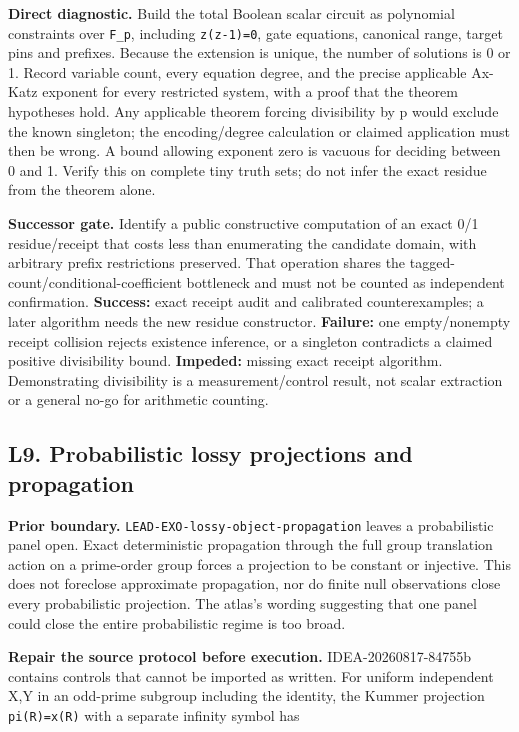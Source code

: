 \documentclass[
  10pt,
]{article}
\begin{document}
\textbf{Direct diagnostic.} Build the total Boolean scalar circuit as
polynomial constraints over \texttt{F\_p}, including \texttt{z(z-1)=0},
gate equations, canonical range, target pins and prefixes. Because the
extension is unique, the number of solutions is 0 or 1. Record variable
count, every equation degree, and the precise applicable Ax-Katz
exponent for every restricted system, with a proof that the theorem
hypotheses hold. Any applicable theorem forcing divisibility by p would
exclude the known singleton; the encoding/degree calculation or claimed
application must then be wrong. A bound allowing exponent zero is
vacuous for deciding between 0 and 1. Verify this on complete tiny truth
sets; do not infer the exact residue from the theorem alone.

\textbf{Successor gate.} Identify a public constructive computation of
an exact 0/1 residue/receipt that costs less than enumerating the
candidate domain, with arbitrary prefix restrictions preserved. That
operation shares the tagged-count/conditional-coefficient bottleneck and
must not be counted as independent confirmation. \textbf{Success:} exact
receipt audit and calibrated counterexamples; a later algorithm needs
the new residue constructor. \textbf{Failure:} one empty/nonempty
receipt collision rejects existence inference, or a singleton
contradicts a claimed positive divisibility bound. \textbf{Impeded:}
missing exact receipt algorithm. Demonstrating divisibility is a
measurement/control result, not scalar extraction or a general no-go for
arithmetic counting.

\subsection{L9. Probabilistic lossy projections and
propagation}\label{l9.-probabilistic-lossy-projections-and-propagation}

\textbf{Prior boundary.} \texttt{LEAD-EXO-lossy-object-propagation}
leaves a probabilistic panel open. Exact deterministic propagation
through the full group translation action on a prime-order group forces
a projection to be constant or injective. This does not foreclose
approximate propagation, nor do finite null observations close every
probabilistic projection. The atlas's wording suggesting that one panel
could close the entire probabilistic regime is too broad.

\textbf{Repair the source protocol before execution.}
IDEA-20260817-84755b contains controls that cannot be imported as
written. For uniform independent X,Y in an odd-prime subgroup including
the identity, the Kummer projection \texttt{pi(R)=x(R)} with a separate
infinity symbol has
\end{document}
